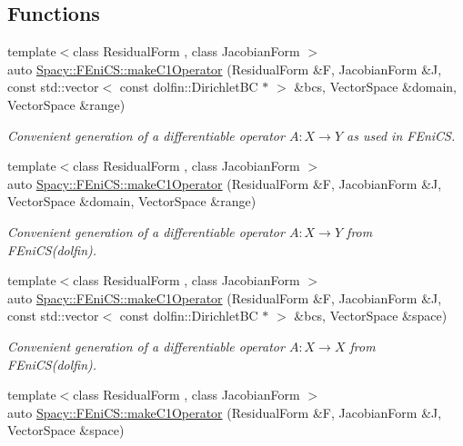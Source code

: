 \subsection*{Functions}
\begin{DoxyCompactItemize}
\item 
{\footnotesize template$<$class Residual\+Form , class Jacobian\+Form $>$ }\\auto \hyperlink{group__FenicsGroup_ga5b21d39905318b5e3f36b71c1fb525e9_ga5b21d39905318b5e3f36b71c1fb525e9}{Spacy\+::\+F\+Eni\+C\+S\+::make\+C1\+Operator} (Residual\+Form \&F, Jacobian\+Form \&J, const std\+::vector$<$ const dolfin\+::\+Dirichlet\+B\+C $\ast$ $>$ \&bcs, Vector\+Space \&domain, Vector\+Space \&range)
\begin{DoxyCompactList}\small\item\em Convenient generation of a differentiable operator $A: X\rightarrow Y$ as used in F\+Eni\+C\+S. \end{DoxyCompactList}\item 
{\footnotesize template$<$class Residual\+Form , class Jacobian\+Form $>$ }\\auto \hyperlink{group__FenicsGroup_gaecd46636694770dba7c8f99325341eda_gaecd46636694770dba7c8f99325341eda}{Spacy\+::\+F\+Eni\+C\+S\+::make\+C1\+Operator} (Residual\+Form \&F, Jacobian\+Form \&J, Vector\+Space \&domain, Vector\+Space \&range)
\begin{DoxyCompactList}\small\item\em Convenient generation of a differentiable operator $A: X\rightarrow Y$ from F\+Eni\+C\+S(dolfin). \end{DoxyCompactList}\item 
{\footnotesize template$<$class Residual\+Form , class Jacobian\+Form $>$ }\\auto \hyperlink{group__FenicsGroup_gafc3de3603a9ac312096d742da2b5752b_gafc3de3603a9ac312096d742da2b5752b}{Spacy\+::\+F\+Eni\+C\+S\+::make\+C1\+Operator} (Residual\+Form \&F, Jacobian\+Form \&J, const std\+::vector$<$ const dolfin\+::\+Dirichlet\+B\+C $\ast$ $>$ \&bcs, Vector\+Space \&space)
\begin{DoxyCompactList}\small\item\em Convenient generation of a differentiable operator $A: X\rightarrow X$ from F\+Eni\+C\+S(dolfin). \end{DoxyCompactList}\item 
{\footnotesize template$<$class Residual\+Form , class Jacobian\+Form $>$ }\\auto \hyperlink{group__FenicsGroup_ga508af586ecdbc9f099759ffec06e99df_ga508af586ecdbc9f099759ffec06e99df}{Spacy\+::\+F\+Eni\+C\+S\+::make\+C1\+Operator} (Residual\+Form \&F, Jacobian\+Form \&J, Vector\+Space \&space)

\end{DoxyCompactItemize}
